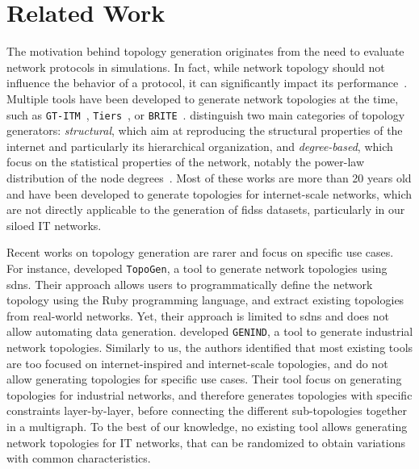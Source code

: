 \section{Related Work\label{sec:topologies.related}}

The motivation behind topology generation originates from the need to evaluate network protocols in simulations.
In fact, while network topology should not influence the behavior of a protocol, it can significantly impact its performance~\cite{tangmunarunkit_Networktopologygenerators_2002}.
Multiple tools have been developed to generate network topologies at the time, such as \texttt{GT-ITM}~\cite{calvert_ModelingInternettopology_1997}, \texttt{Tiers}~\cite{doar_bettermodelgenerating_1996}, or \texttt{BRITE}~\cite{medina_BRITEapproachuniversal_2001}.
\Textcite{tangmunarunkit_Networktopologygenerators_2002} distinguish two main categories of topology generators: \emph{structural}, which aim at reproducing the structural properties of the internet and particularly its hierarchical organization, and \emph{degree-based}, which focus on the statistical properties of the network, notably the power-law distribution of the node degrees~\cite{faloutsos_powerlawrelationshipsInternet_1999}.
Most of these works are more than 20 years old and have been developed to generate topologies for internet-scale networks, which are not directly applicable to the generation of \glspl{fids} datasets, particularly in our siloed IT networks.

Recent works on topology generation are rarer and focus on specific use cases.
For instance, \textcite{laurito_TopoGennetworktopology_2017} developed \texttt{TopoGen}, a tool to generate network topologies using \glspl{sdn}.
Their approach allows users to programmatically define the network topology using the Ruby programming language, and extract existing topologies from real-world networks.
Yet, their approach is limited to \glspl{sdn} and does not allow automating data generation.
\Textcite{alrumaih_GENINDindustrialnetwork_2023} developed \texttt{GENIND}, a tool to generate industrial network topologies.
Similarly to us, the authors identified that most existing tools are too focused on internet-inspired and internet-scale topologies, and do not allow generating topologies for specific use cases.
Their tool focus on generating topologies for industrial networks, and therefore generates topologies with specific constraints layer-by-layer, before connecting the different sub-topologies together in a multigraph.
To the best of our knowledge, no existing tool allows generating network topologies for IT networks, that can be randomized to obtain variations with common characteristics.

